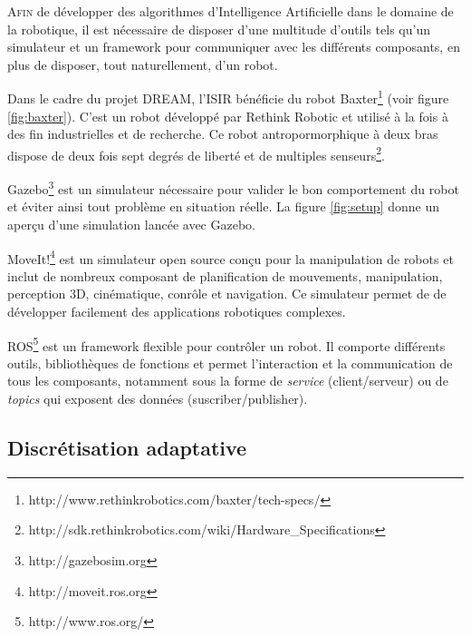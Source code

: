 \documentclass{llncs}
\begin{document}
\lettrine{A}{fin} de développer des algorithmes d'Intelligence Artificielle dans le domaine de la robotique, il est nécessaire de disposer d'une multitude d'outils tels qu'un simulateur et un framework pour communiquer avec les différents composants, en plus de disposer, tout naturellement, d'un robot.

Dans le cadre du projet DREAM, l'ISIR bénéficie du robot Baxter\footnote{http://www.rethinkrobotics.com/baxter/tech-specs/} (voir figure \ref{fig:baxter}). C'est un robot développé par Rethink Robotic et utilisé à la fois à des fin industrielles et de recherche. Ce robot antropormorphique à deux bras dispose de deux fois sept degrés de liberté et de multiples senseurs\footnote{http://sdk.rethinkrobotics.com/wiki/Hardware\_Specifications}.

Gazebo\footnote{http://gazebosim.org} est un simulateur nécessaire pour valider le bon comportement du robot et éviter ainsi tout problème en situation réelle. La figure \ref{fig:setup} donne un aperçu d'une simulation lancée avec Gazebo.

MoveIt!\footnote{http://moveit.ros.org} est un simulateur open source conçu pour la manipulation de robots et inclut de nombreux composant de planification de mouvements, manipulation, perception 3D, cinématique, conrôle et navigation. Ce simulateur permet de de développer facilement des applications robotiques complexes.

ROS\footnote{http://www.ros.org/} est un framework flexible pour contrôler un robot. Il comporte différents outils, bibliothèques de fonctions et permet l'interaction et la communication de tous les composants, notamment sous la forme de \textit{service} (client/serveur) ou de \textit{topics} qui exposent des données (suscriber/publisher).









\subsection{Discrétisation adaptative}
\end{document}
